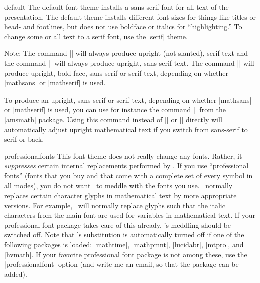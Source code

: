 \begin{fontthemeexample}{default}
  The default font theme installs a sans serif font for all text of
  the presentation. The default theme installs different font sizes
  for things like titles or head- and footlines, but does not use
  boldface or italics for ``highlighting.'' To change some or all text
  to a serif font, use the |serif| theme.

  Note: The command |\mathrm| will always produce upright (not
  slanted), serif text and the command |\mathsf| will always produce
  upright, sans-serif text. The command |\mathbf| will produce
  upright, bold-face, sans-serif or serif text, depending on whether
  |mathsans| or |mathserif| is used.

  To produce an upright, sans-serif or serif text, depending on
  whether |mathsans| or |mathserif| is used, you can use for instance
  the command |\operatorname| from the |amsmath| package. Using this
  command instead of |\mathrm| or |\mathsf| directly will
  automatically adjust  upright mathematical text if you switch from
  sans-serif to serif or back.
\end{fontthemeexample}

\begin{fontthemeexample*}{professionalfonts}
  This font theme does not really change any fonts. Rather, it
  \emph{suppresses} certain internal replacements performed by
  \beamer. If you use ``professional fonts'' (fonts that you buy and
  that come with a complete set of every symbol in all modes), you do
  not want \beamer\ to meddle with the fonts you use.  \beamer\
  normally replaces certain character glyphs in mathematical text by
  more appropriate versions. For example, \beamer\ will normally
  replace glyphs such that the italic characters from the main font
  are used for variables in mathematical text. If your professional
  font package takes care of this already, \beamer's meddling should
  be switched off. Note that \beamer's substitution is automatically
  turned off if one of the following packages is loaded: |mathtime|,
  |mathpmnt|, |lucidabr|, |mtpro|, and |hvmath|. If your favorite
  professional font package is not among these, use the
  |professionalfont| option (and write me an email, so that the
  package can be added).
\end{fontthemeexample*}




